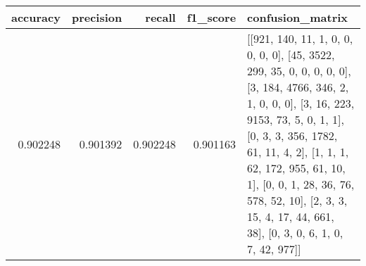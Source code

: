 \begin{tabular}{rrrrl}
\toprule
accuracy & precision & recall & f1_score & confusion_matrix \\
\midrule
0.902248 & 0.901392 & 0.902248 & 0.901163 & [[921, 140, 11, 1, 0, 0, 0, 0, 0], [45, 3522, 299, 35, 0, 0, 0, 0, 0], [3, 184, 4766, 346, 2, 1, 0, 0, 0], [3, 16, 223, 9153, 73, 5, 0, 1, 1], [0, 3, 3, 356, 1782, 61, 11, 4, 2], [1, 1, 1, 62, 172, 955, 61, 10, 1], [0, 0, 1, 28, 36, 76, 578, 52, 10], [2, 3, 3, 15, 4, 17, 44, 661, 38], [0, 3, 0, 6, 1, 0, 7, 42, 977]] \\
\bottomrule
\end{tabular}
